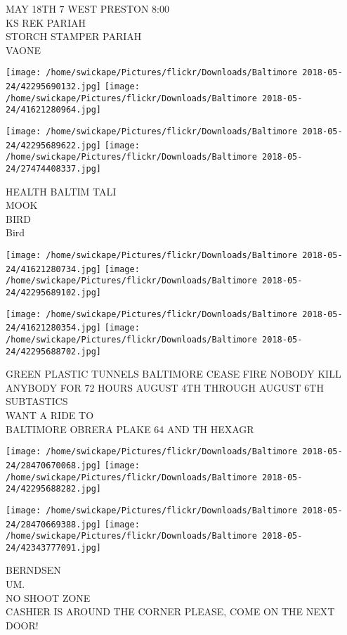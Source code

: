 \documentclass[10pt,letterpaper]{article}
\begin{document}
MAY 18TH 7 WEST PRESTON 8:00\\
KS REK PARIAH\\
STORCH STAMPER PARIAH\\
VAONE
\pagebreak

\texttt{[image: /home/swickape/Pictures/flickr/Downloads/Baltimore 2018-05-24/42295690132.jpg]}
\texttt{[image: /home/swickape/Pictures/flickr/Downloads/Baltimore 2018-05-24/41621280964.jpg]}

\texttt{[image: /home/swickape/Pictures/flickr/Downloads/Baltimore 2018-05-24/42295689622.jpg]}
\texttt{[image: /home/swickape/Pictures/flickr/Downloads/Baltimore 2018-05-24/27474408337.jpg]}

HEALTH BALTIM TALI\\
MOOK\\
BIRD\\
Bird
\pagebreak

\texttt{[image: /home/swickape/Pictures/flickr/Downloads/Baltimore 2018-05-24/41621280734.jpg]}
\texttt{[image: /home/swickape/Pictures/flickr/Downloads/Baltimore 2018-05-24/42295689102.jpg]}

\texttt{[image: /home/swickape/Pictures/flickr/Downloads/Baltimore 2018-05-24/41621280354.jpg]}
\texttt{[image: /home/swickape/Pictures/flickr/Downloads/Baltimore 2018-05-24/42295688702.jpg]}

GREEN PLASTIC TUNNELS BALTIMORE CEASE FIRE NOBODY KILL ANYBODY FOR 72 HOURS AUGUST 4TH THROUGH AUGUST 6TH\\
SUBTASTICS\\
WANT A RIDE TO\\
BALTIMORE OBRERA PLAKE 64 AND TH HEXAGR
\pagebreak

\texttt{[image: /home/swickape/Pictures/flickr/Downloads/Baltimore 2018-05-24/28470670068.jpg]}
\texttt{[image: /home/swickape/Pictures/flickr/Downloads/Baltimore 2018-05-24/42295688282.jpg]}

\texttt{[image: /home/swickape/Pictures/flickr/Downloads/Baltimore 2018-05-24/28470669388.jpg]}
\texttt{[image: /home/swickape/Pictures/flickr/Downloads/Baltimore 2018-05-24/42343777091.jpg]}

BERNDSEN\\
UM.\\
NO SHOOT ZONE\\
CASHIER IS AROUND THE CORNER PLEASE, COME ON THE NEXT DOOR!
\pagebreak
\end{document}
